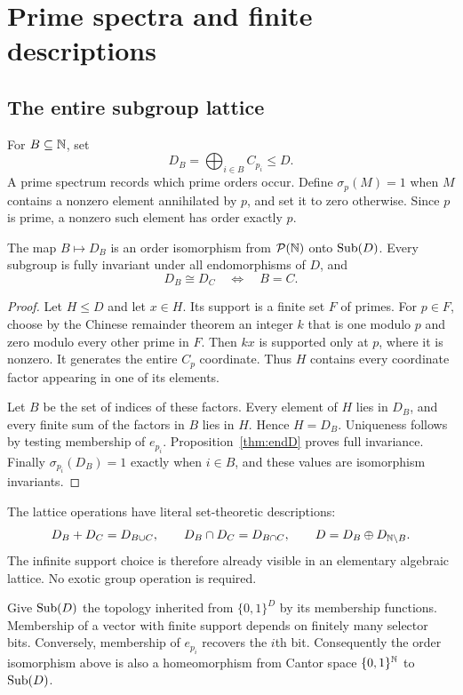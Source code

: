 \chapter{Prime spectra and finite descriptions}
\label{ch:spectrum}

\section{The entire subgroup lattice}
For $B\subseteq\mathbb N$, set
\[
D_B=\bigoplus_{i\in B}C_{p_i}\le D.
\]
A prime spectrum records which prime orders occur. Define $\sigma_p(M)=1$ when $M$ contains a nonzero element annihilated by $p$, and set it to zero otherwise. Since $p$ is prime, a nonzero such element has order exactly $p$.

\begin{theorem}
\label{thm:subD}
The map $B\mapsto D_B$ is an order isomorphism from $\mathcal P(\mathbb N)$ onto $\operatorname{Sub}(D)$. Every subgroup is fully invariant under all endomorphisms of $D$, and
\[
D_B\cong D_C\quad\Longleftrightarrow\quad B=C.
\]
\end{theorem}
\begin{proof}
Let $H\le D$ and let $x\in H$. Its support is a finite set $F$ of primes. For $p\in F$, choose by the Chinese remainder theorem an integer $k$ that is one modulo $p$ and zero modulo every other prime in $F$. Then $kx$ is supported only at $p$, where it is nonzero. It generates the entire $C_p$ coordinate. Thus $H$ contains every coordinate factor appearing in one of its elements.

Let $B$ be the set of indices of these factors. Every element of $H$ lies in $D_B$, and every finite sum of the factors in $B$ lies in $H$. Hence $H=D_B$. Uniqueness follows by testing membership of $e_{p_i}$. Proposition~\ref{thm:endD} proves full invariance. Finally $\sigma_{p_i}(D_B)=1$ exactly when $i\in B$, and these values are isomorphism invariants.
\end{proof}
The lattice operations have literal set-theoretic descriptions:
\[
D_B+D_C=D_{B\cup C},\qquad D_B\cap D_C=D_{B\cap C},
\qquad D=D_B\oplus D_{\mathbb N\setminus B}.
\]
The infinite support choice is therefore already visible in an elementary algebraic lattice. No exotic group operation is required.

Give $\operatorname{Sub}(D)$ the topology inherited from $\{0,1\}^D$ by its membership functions. Membership of a vector with finite support depends on finitely many selector bits. Conversely, membership of $e_{p_i}$ recovers the $i$th bit. Consequently the order isomorphism above is also a homeomorphism from Cantor space $\{0,1\}^{\mathbb N}$ to $\operatorname{Sub}(D)$.

